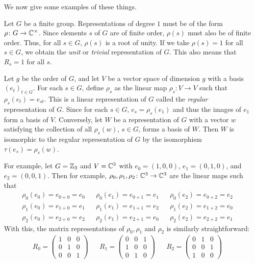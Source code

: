 \documentclass[letterpaper, 11pt, oneside]{book}
\begin{document}
We now give some examples of these things.
\begin{ex}\label{ex:unit_trivial_representation}
  Let $G$ be a finite group.
  Representations of degree $1$ must be of the form $\rho\colon G \to \mathbb{C}^{\times}$.
  Since elements $s$ of $G$ are of finite order, $\rho(s)$ must also be of finite order.
  Thus, for all $s \in G$, $\rho(s)$ is a root of unity.
  If we take $\rho(s) = 1$ for all $s \in G$, we obtain the \emph{unit} or \emph{trivial} representation of $G$.
  This also means that $R_{s} = 1$ for all $s$.
\end{ex}

\begin{ex}\label{ex:regular_representation_Z3}
  Let $g$ be the order of $G$, and let $V$ be a vector space of dimension $g$ with a basis $(e_{t})_{t \in G}$.
  For each $s \in G$, define $\rho_{s}$ as the linear map $\rho_{s}\colon V \to V$ such that $\rho_{s}(e_{t}) = e_{st}$.
  This is a linear representation of $G$ called the \emph{regular} representation of $G$.
  Since for each $s \in G$, $e_{s} = \rho_{s}(e_{1})$ and thus the images of $e_{1}$ form a basis of $V$.
  Conversely, let $W$ be a representation of $G$ with a vector $w$ satisfying the collection of all $\rho_{s}(w)$, $s \in G$, forms a basis of $W$.
  Then $W$ is isomorphic to the regular representation of $G$ by the isomorphism $\tau(e_{s}) = \rho_{s}(w)$.

  For example, let $G = \mathbb{Z}_{3}$ and $V = \mathbb{C}^{3}$ with $e_{0} = (1, 0, 0)$, $e_{1} = (0, 1, 0)$, and $e_{2} = (0, 0, 1)$.
  Then for example, $\rho_{0}, \rho_{1}, \rho_{2}\colon \mathbb{C}^{3} \to \mathbb{C}^{3}$ are the linear maps such that
  \begin{align*}
    \rho_{0}(e_{0}) = e_{0 + 0} = e_{0} && \rho_{0}(e_{1}) = e_{0 + 1} = e_{1} && \rho_{0}(e_{2}) = e_{0 + 2} = e_{2} \\
    \rho_{1}(e_{0}) = e_{1 + 0} = e_{1} && \rho_{1}(e_{1}) = e_{1 + 1} = e_{2} && \rho_{1}(e_{2}) = e_{1 + 2} = e_{0} \\
    \rho_{2}(e_{0}) = e_{2 + 0} = e_{2} && \rho_{2}(e_{1}) = e_{2 + 1} = e_{0} && \rho_{2}(e_{2}) = e_{2 + 2} = e_{1}
  \end{align*}
  With this, the matrix representations of $\rho_{0}, \rho_{1}$ and $\rho_{2}$ is similarly straightforward:
  \begin{align*}
    R_{0} = \begin{pmatrix} 1 & 0 & 0 \\ 0 & 1 & 0 \\ 0 & 0 & 1 \end{pmatrix} && R_{1} = \begin{pmatrix} 0 & 0 & 1 \\ 1 & 0 & 0 \\ 0 & 1 & 0 \end{pmatrix} && R_{2} = \begin{pmatrix} 0 & 1 & 0 \\ 0 & 0 & 1 \\ 1 & 0 & 0 \end{pmatrix}
  \end{align*}
\end{ex}
\end{document}
